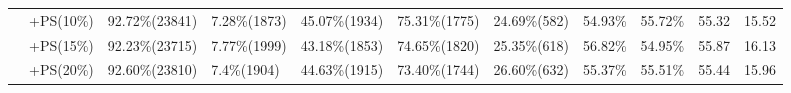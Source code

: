 \documentclass[a4paper]{article}
\begin{document}
\begin{table}[]
{\begin{tabular}{l|r|l|l|l|l|l|l|c|c|l|}
 & +PS(10\%)                                    & 92.72\%(23841)                                                                              & 7.28\%(1873)                                                                                    & 45.07\%(1934)                                                                                 & 75.31\%(1775)                                                                  & 24.69\%(582)                                                                & 54.93\%                       & 55.72\%                          & 55.32               & 15.52                \\ \cline{2-11} 
 
 & +PS(15\%)                                    & 92.23\%(23715)                                                                              & 7.77\%(1999)                                                                                    & 43.18\%(1853)                                                                                 & 74.65\%(1820)                                                                  & 25.35\%(618)                                                                & 56.82\%                       & 54.95\%                          & 55.87               & 16.13                \\ \cline{2-11} 
 
 & +PS(20\%)                                    & 92.60\%(23810)                                                                              & 7.4\%(1904)                                                                                    & 44.63\%(1915)                                                                                 & 73.40\%(1744)                                                                  & 26.60\%(632)                                                                & 55.37\%                       & 55.51\%                          & 55.44               & 15.96                \\ \cline{2-11} 
 

\end{tabular}}
\end{table}
\end{document}
